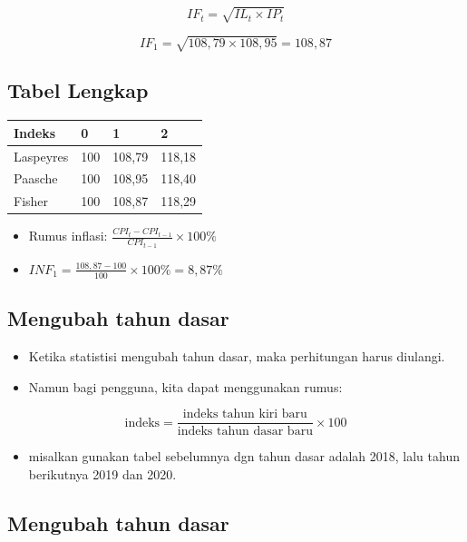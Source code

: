 \documentclass[
  letterpaper,
  DIV=11,
  numbers=noendperiod]{scrartcl}
\providecommand{\tightlist}{%
  \setlength{\itemsep}{0pt}\setlength{\parskip}{0pt}}\usepackage{longtable,booktabs,array}
\begin{document}
\[
IF_t=\sqrt{IL_t \times IP_t}
\]

\[
IF_1=\sqrt{108,79\times 108,95}=108,87
\]

\subsection{Tabel Lengkap}\label{tabel-lengkap}

\begin{longtable}[]{@{}llll@{}}
\toprule\noalign{}
Indeks & 0 & 1 & 2 \\
\midrule\noalign{}
\endhead
\bottomrule\noalign{}
\endlastfoot
Laspeyres & 100 & 108,79 & 118,18 \\
Paasche & 100 & 108,95 & 118,40 \\
Fisher & 100 & 108,87 & 118,29 \\
\end{longtable}

\begin{itemize}
\item
  Rumus inflasi: \(\frac{CPI_t-CPI_{t-1}}{CPI_{t-1}} \times 100\%\)
\item
  \(INF_1=\frac{108,87-100}{100}\times 100\%=8,87\%\)
\end{itemize}

\subsection{Mengubah tahun dasar}\label{mengubah-tahun-dasar}

\begin{itemize}
\item
  Ketika statistisi mengubah tahun dasar, maka perhitungan harus
  diulangi.
\item
  Namun bagi pengguna, kita dapat menggunakan rumus:
\end{itemize}

\[
\text{indeks}=\frac{\text{indeks tahun kiri baru}}{\text{indeks tahun dasar baru}}\times 100
\]

\begin{itemize}
\tightlist
\item
  misalkan gunakan tabel sebelumnya dgn tahun dasar adalah 2018, lalu
  tahun berikutnya 2019 dan 2020.
\end{itemize}

\subsection{Mengubah tahun dasar}\label{mengubah-tahun-dasar-1}
\end{document}
